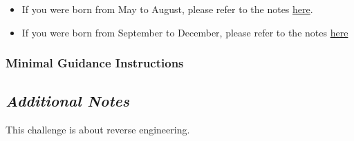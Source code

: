 {{{\begin{itemize}
                        \item If you were born from May to August, please refer to the notes \href{https://github.com/brendonky18/Honors-Thesis.CTFs/blob/main/going-backwards/notes_1.md}{here}.







                        \item If you were born from September to December, please refer to the notes \href{https://github.com/brendonky18/Honors-Thesis.CTFs/blob/main/going-backwards/notes_1.md}{here}







                    \end{itemize}















            }







        \newpage







        \subsubsection{Minimal Guidance Instructions}







            {\parindent0pt\singlespacing







                \subsection*{\textit{Additional Notes}}







                    This challenge is about reverse engineering. %







}}}
